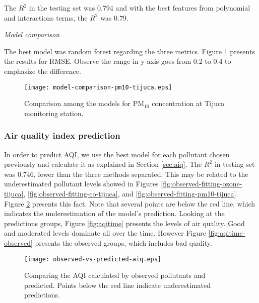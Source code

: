 \vspace{2mm}

The $R^2$ in the testing set was 0.794 and with the best features from
polynomial and interactions terms, the $R^2$ was 0.79.

{\em Model comparison} 

\vspace{2mm}

The best model was random forest regarding the three metrics. Figure
\ref{fig:model-comparison-pm10-tijuca} presents the results for RMSE. Observe
the range in y axis goes from 0.2 to 0.4 to emphasize the difference.

\begin{figure}
    \centering
    \texttt{[image: model-comparison-pm10-tijuca.eps]}
    \caption{Comparison among the models for PM$_{10}$ concentration at Tijuca monitoring station.}
    \label{fig:model-comparison-pm10-tijuca}
\end{figure}

\subsubsection{Air quality index prediction}

In order to predict AQI, we use the best model for each pollutant
chosen previously and calculate it as explained in Section
\ref{sec:aiq}. The $R^2$ in testing set was 0.746, lower than the three
methods separated. This may be related to the underestimated pollutant levels
showed in Figures \ref{fig:observed-fitting-ozone-tijuca},
\ref{fig:observed-fitting-co-tijuca}, and
\ref{fig:observed-fitting-pm10-tijuca}. Figure
\ref{fig:observed-vs-predicted-aqi} presents this fact. Note that several
points are below the red line, which indicates the underestimation of the
model's prediction. Looking at the predictions groups, Figure
\ref{fig:aqitime} presents the levels of air quality. Good and moderated
levels dominate all over the time. However Figure \ref{fig:aqitime-observed}
presents the observed groups, which includes bad quality. 

\begin{figure}
    \centering
    \texttt{[image: observed-vs-predicted-aiq.eps]}
    \caption{Comparing the AQI calculated by observed pollutants and predicted. Points below the red line indicate underestimated predictions.}
    \label{fig:observed-vs-predicted-aqi}
\end{figure}

